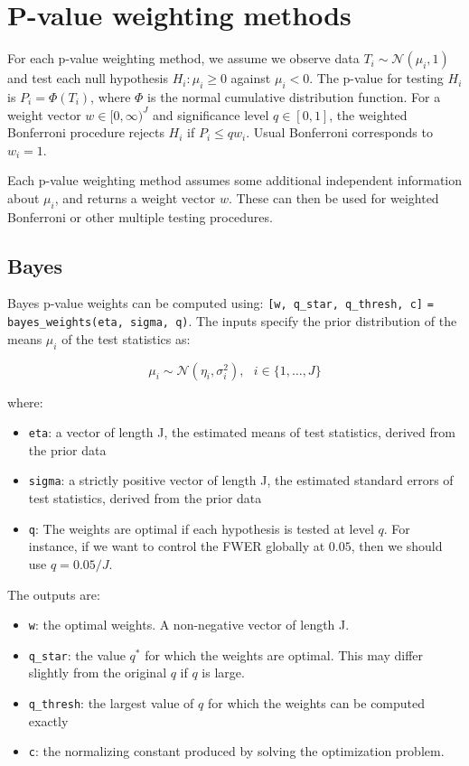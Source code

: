 \documentclass[english,11pt]{article} %
\begin{document}
\section{P-value weighting methods}
\label{methods}

For each p-value weighting method, we assume we observe data $T_i \sim \mathcal{N}(\mu_i, 1)$ and test each null hypothesis $H_i: \mu_i \ge 0$ against $\mu_i <0$.  The p-value for testing $H_i$ is $P_i = \Phi(T_i)$, where $\Phi$ is the normal cumulative distribution function.  For a weight vector $w \in [0,\infty)^{J}$ and significance level $q \in [0,1]$, the weighted Bonferroni procedure rejects $H_{i}$ if $P_i \le q w_i$. Usual Bonferroni corresponds to $w_i=1$.

Each p-value weighting method assumes some additional independent information about $\mu_i$, and returns a weight vector $w$. These can then be used for weighted Bonferroni or other multiple testing procedures.

\subsection{Bayes}


Bayes p-value weights can be computed using:  \verb+[w, q_star, q_thresh, c]+ \verb+= bayes_weights(eta, sigma, q)+. The inputs specify the prior distribution of the means $\mu_i $ of the test statistics as:

$$\mu_i \sim \mathcal{N}(\eta_i,\sigma_i^2), \mbox{   } i \in \{1,\ldots, J\}$$ 

where:

\begin{itemize}
\item \verb+eta+:  a vector of length J, the estimated means of test statistics, derived from the prior data
\item \verb+sigma+:  a strictly positive vector of length J, the estimated standard errors of test statistics, derived from the prior data
\item \verb+q+: The weights are optimal if each hypothesis is tested at level $q$. For instance, if we want to control the FWER globally at $0.05$, then we should use $q = 0.05/J$.
\end{itemize}

The outputs are: 
\begin{itemize}
\item \verb+w+:  the optimal weights. A non-negative vector of length J.
\item \verb+q_star+: the value $q^*$ for which the weights are optimal. This may differ slightly from the original $q$ if $q$ is large.
\item \verb+q_thresh+: the largest value of $q$ for which the weights can be computed exactly 
\item \verb+c+:  the normalizing constant produced by solving the optimization problem.
\end{itemize}
\end{document}
